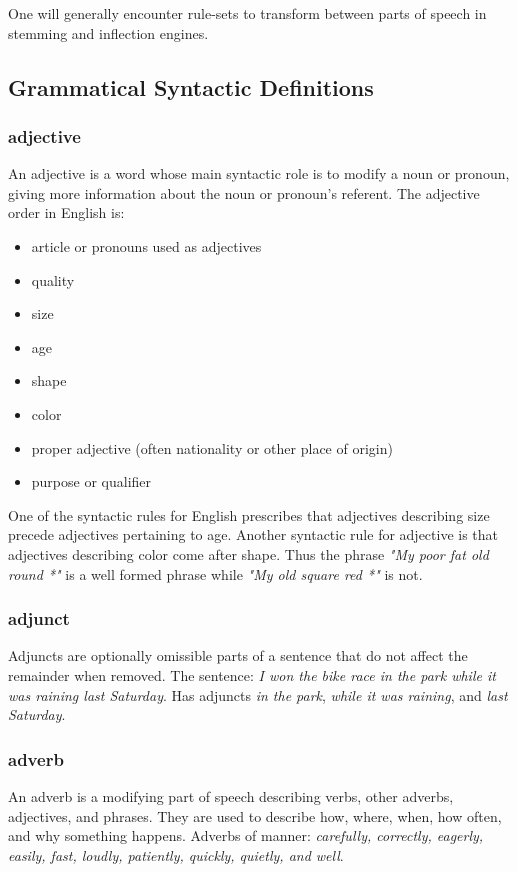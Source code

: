 One will generally encounter rule-sets to transform between parts of speech in stemming and inflection engines.


\begin{small}
\subsection{Grammatical Syntactic Definitions}
\subsubsection{adjective}
An adjective is a word whose main syntactic role is to modify a noun or pronoun, giving more information about the noun or pronoun's referent. The adjective order in English is:
\begin{center}
\begin{itemize}
  \item article or pronouns used as adjectives
  \item quality
  \item size
  \item age
  \item shape
  \item color
  \item proper adjective (often nationality or other place of origin)
  \item purpose or qualifier
\end{itemize}
\end{center}
One of the syntactic rules for English prescribes that adjectives describing size precede adjectives pertaining to age.  Another syntactic rule for adjective is that adjectives describing color come after shape. Thus the phrase \emph{"My poor fat old round *"} is a well formed phrase while \emph{"My old square red *"} is not.

\subsubsection{adjunct}
 Adjuncts are optionally omissible parts of a sentence that do not affect the remainder when removed. The sentence: \emph{I won the bike race in the park while it was raining last Saturday}.  Has adjuncts \emph{in the park}, \emph{ while it was raining}, and \emph{last Saturday}.

\subsubsection{adverb}
An adverb is a modifying part of speech describing verbs, other adverbs, adjectives, and phrases. They are used to describe how, where, when, how often, and why something happens.
Adverbs of manner:  \emph{carefully, correctly, eagerly, easily, fast, loudly, patiently,  quickly, quietly, and well}.


\end{small}
